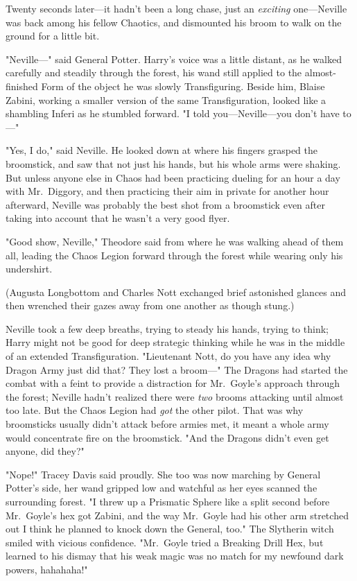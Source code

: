 Twenty seconds later---it hadn't been a long chase, just an \emph{exciting}
one---Neville was back among his fellow Chaotics, and dismounted his broom to
walk on the ground for a little bit.

"Neville---" said General Potter. Harry's voice was a little distant, as he
walked carefully and steadily through the forest, his wand still applied to the
almost-finished Form of the object he was slowly Transfiguring. Beside him,
Blaise Zabini, working a smaller version of the same Transfiguration, looked
like a shambling Inferi as he stumbled forward. "I told you---Neville---you
don't have to---"

"Yes, I do," said Neville. He looked down at where his fingers grasped the
broomstick, and saw that not just his hands, but his whole arms were shaking.
But unless anyone else in Chaos had been practicing dueling for an hour a day
with Mr.~Diggory, and then practicing their aim in private for another hour
afterward, Neville was probably the best shot from a broomstick even after
taking into account that he wasn't a very good flyer.

"Good show, Neville," Theodore said from where he was walking ahead of them
all, leading the Chaos Legion forward through the forest while wearing only his
undershirt.

(Augusta Longbottom and Charles Nott exchanged brief astonished glances and
then wrenched their gazes away from one another as though stung.)

Neville took a few deep breaths, trying to steady his hands, trying to think;
Harry might not be good for deep strategic thinking while he was in the middle
of an extended Transfiguration. "Lieutenant Nott, do you have any idea why
Dragon Army just did that? They lost a broom---" The Dragons had started the
combat with a feint to provide a distraction for Mr.~Goyle's approach through
the forest; Neville hadn't realized there were \emph{two} brooms attacking
until almost too late. But the Chaos Legion had \emph{got} the other pilot.
That was why broomsticks usually didn't attack before armies met, it meant a
whole army would concentrate fire on the broomstick. "And the Dragons didn't
even get anyone, did they?"

"Nope!" Tracey Davis said proudly. She too was now marching by General Potter's
side, her wand gripped low and watchful as her eyes scanned the surrounding
forest. "I threw up a Prismatic Sphere like a split second before Mr.~Goyle's
hex got Zabini, and the way Mr.~Goyle had his other arm stretched out I think
he planned to knock down the General, too." The Slytherin witch smiled with
vicious confidence. "Mr.~Goyle tried a Breaking Drill Hex, but learned to his
dismay that his weak magic was no match for my newfound dark powers, hahahaha!"

